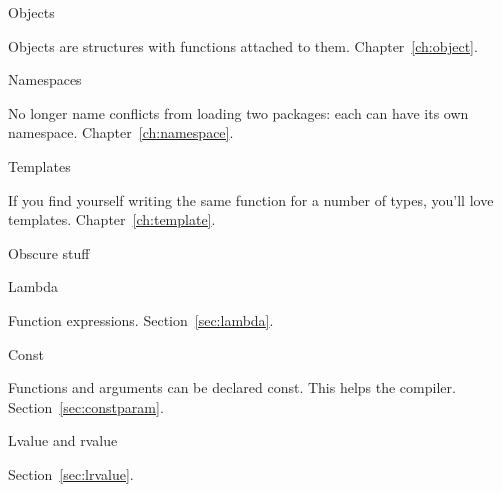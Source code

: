  {Objects}

Objects are structures with functions attached to
them. Chapter~\ref{ch:object}.

 {Namespaces}

No longer name conflicts from loading two packages: each can have its
own namespace. Chapter~\ref{ch:namespace}.

 {Templates}

If you find yourself writing the same function for a number of types,
you'll love templates. Chapter~\ref{ch:template}.

 {Obscure stuff}

 {Lambda}

Function expressions.
Section~\ref{sec:lambda}.

 {Const}

Functions and arguments can be declared const. This helps the
compiler. Section~\ref{sec:constparam}.

 {Lvalue and rvalue}

Section~\ref{sec:lrvalue}.

\endinput

You’ll have no destructors, so cleanup is manual. This is most fun
with early-return functions, but it can keep you entertained for all
cases. File handles, memory, and other resources (thread locks,
anyone) are all waiting patiently and silently for you to forget them.

Initialization has be be explicitly called. No constructors either.

Want inheritance? Sure. Write your own vtable (often done with function pointers in a struct).
Instead of templates, you’ll need to abandon type safety and cast back and forth to (void*). Don’t explicitly cast to (void *), because the compiler never warns about explicit or implicit casts to and from (void *).

You’ll also need to make sure you’re using the right library calls - snprintf versus sprintf etc. Hopefully an existing project will be using the right ones.

On the plus side, you’re moving to Linux, and a lot of the tooling available is - while very command-line oriented - very good indeed.

For an IDE, I’d recommend CLion from JetBrains, but I’m told that with sufficient patience, Atom can be encouraged into doing useful stuff.

You’ll find that while the command-line of GDB, the debugger, isn’t very easy to learn to begin with, it’s very powerful, allowing you to do conditional breakpoints with comparative ease.

Valgrind is amazing. Voodoo. It’ll find uninitialized memory, allocation errors, overflows, and leaks - all common and hard to debug issues in C.

The CLang static analyzer is pretty impressive, too.

(copied from
\url{https://www.quora.com/How-should-a-C++-programmer-learn-Linux-C/answer/Dave-Cridland})
